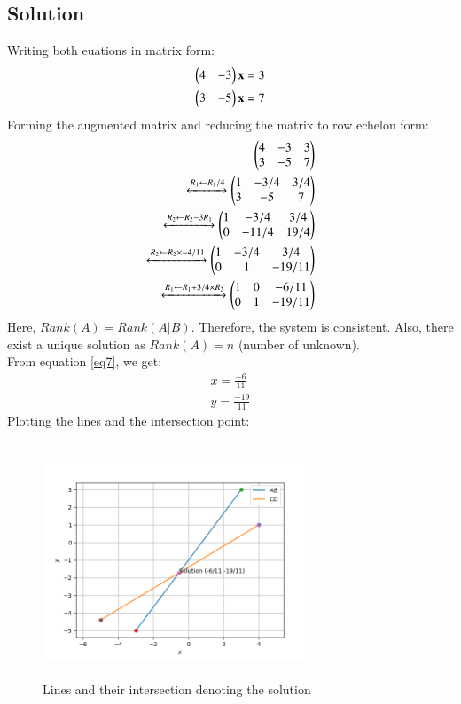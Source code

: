 \documentclass[journal,12pt,twocolumn]{IEEEtran}
\begin{document}
\subsection{Solution}
Writing both euations in matrix form:
\begin{align}
    \begin{pmatrix}4 & -3\end{pmatrix}\mathbf{x}=3\\
    \begin{pmatrix}3 & -5\end{pmatrix}\mathbf{x}=7
\end{align}
Forming the augmented matrix and reducing the matrix to row echelon form:
\begin{align}
\begin{pmatrix}4 & -3 & 3\\3 & -5 & 7\end{pmatrix}\\
\xleftrightarrow[]{R_1\leftarrow R_1/4}
\begin{pmatrix}1 & -3/4 & 3/4\\3 & -5 & 7\end{pmatrix}\\
\xleftrightarrow[]{R_2\leftarrow R_2-3R_1}   
\begin{pmatrix}1 & -3/4 & 3/4\\0 & -11/4 &19/4\end{pmatrix}\\
\xleftrightarrow[]{R_2\leftarrow R_2\times-4/11}
\begin{pmatrix}1 & -3/4 & 3/4\\0 & 1 &-19/11\end{pmatrix}\\
\xleftrightarrow[]{R_1\leftarrow R_1+3/4\times R_2}
\begin{pmatrix}1 & 0 & -6/11\\0 & 1 &-19/11\end{pmatrix} \label{eq7}
\end{align}
Here, $Rank(A)=Rank(A|B)$. Therefore, the system is consistent. Also, there exist a unique solution as $Rank(A)=n$ (number of unknown).\\ 
From equation \ref{eq7}, we get:
\begin{align}
    x=\frac{-6}{11}\\
    y=\frac{-19}{11}
\end{align}
Plotting the lines and the intersection point:
\begin{figure}[h!]
\centering
\includegraphics[width=8cm, height=7cm]{Figure_31}
\caption{Lines and their intersection denoting the solution}
\label{Fig4}
\end{figure}
\end{document}
